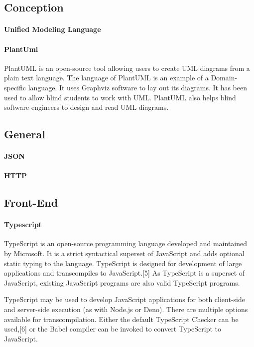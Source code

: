 \subsection{Conception}
\paragraph{Unified Modeling Language}
\paragraph{PlantUml}
PlantUML is an open-source tool allowing users to create UML diagrams from a plain text language. The language of PlantUML is an example of a Domain-specific language. It uses Graphviz software to lay out its diagrams. It has been used to allow blind students to work with UML. PlantUML also helps blind software engineers to design and read UML diagrams.

\subsection{General}
\paragraph{JSON}
\paragraph{HTTP}
\subsection{Front-End}
\paragraph{Typescript}
TypeScript is an open-source programming language developed and maintained by Microsoft. It is a strict syntactical superset of JavaScript and adds optional static typing to the language. TypeScript is designed for development of large applications and transcompiles to JavaScript.[5] As TypeScript is a superset of JavaScript, existing JavaScript programs are also valid TypeScript programs.

TypeScript may be used to develop JavaScript applications for both client-side and server-side execution (as with Node.js or Deno). There are multiple options available for transcompilation. Either the default TypeScript Checker can be used,[6] or the Babel compiler can be invoked to convert TypeScript to JavaScript.

